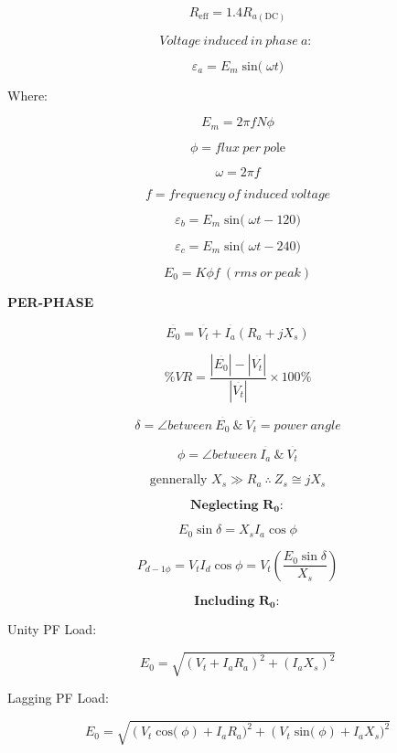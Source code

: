 \begin{multicols}{2}
	\[R_{\text{eff}} = 1.4R_{a\left( \text{DC} \right)}\]
	
	\[Voltage\ induced\ in\ phase\ a:\ \]
	
	\[\varepsilon_{a} = E_{m}\operatorname{sin(}{\omega t)}\]
	
	Where:
	
	\[E_{m} = 2\pi fN\phi\]
	
	\[\phi = flux\ per\ po\text{le}\]
	
	\[\omega = 2\pi f\]
	
	\[f = frequency\ of\ induced\ voltage\]
	
	\[\varepsilon_{b} = E_{m}\operatorname{sin(}{\omega t - 120)}\]
	
	\[\varepsilon_{c} = E_{m}\operatorname{sin(}{\omega t - 240)}\]
	
	\[E_{0} = K\phi f\ (rms\ or\ peak)\]
	
	\textbf{PER-PHASE}
	
	\[\overset{\overline{}}{E_{0}} = \overset{\overline{}}{V_{t}} + \overset{\overline{}}{I_{a}}\left( R_{a} + jX_{s} \right)\]
	
	\[\% VR = \frac{\left| \overset{\overline{}}{E_{0}} \right| - \left| \overset{\overline{}}{V_{t}} \right|}{\left| \overset{\overline{}}{V_{t}} \right|} \times 100\%\]
	
	\[\delta = \angle between\ \overset{\overline{}}{E_{0}}\ \&\ \overset{\overline{}}{V_{t}} = power\ angle\]
	
	\[\phi = \angle between\ \overset{\overline{}}{I_{a}}\ \&\ \overset{\overline{}}{V_{t}}\]
	
	\[\text{gennerally\ }X_{s} \gg R_{a}\ \therefore\ Z_{s} \cong jX_{s}\]
	
	\[\mathbf{\text{Neglecting\ }}\mathbf{R}_{\mathbf{0}}\mathbf{:}\]
	
	\[E_{0}\sin\delta = X_{s}I_{a}\cos\phi\]
	
	\[P_{d - 1\phi} = V_{t}I_{d}\cos{\phi =}V_{t}\left( \frac{E_{0}\sin\delta}{X_{s}} \right)\]
	
	\[\mathbf{\text{Including\ }}\mathbf{R}_{\mathbf{0}}\mathbf{:}\]
	
	Unity PF Load:
	
	\[E_{0} = \sqrt{\left( V_{t} + I_{a}R_{a} \right)^{2} + \left( I_{a}X_{s} \right)^{2}}\]
	
	Lagging PF Load:
	
	\[E_{0} = \sqrt{{\left( V_{t}\operatorname{cos(}\phi \right) + I_{a}R_{a})}^{2} + {\left( V_{t}\operatorname{sin(}\phi \right) + I_{a}X_{s})}^{2}}\]
	

\end{multicols}
